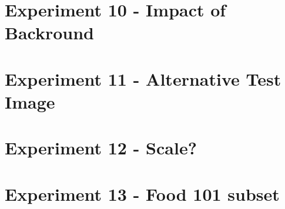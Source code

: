 \section{Experiment 10 - Impact of Backround}


\section{Experiment 11 - Alternative Test Image}


\section{Experiment 12 - Scale?}


\section{Experiment 13 - Food 101 subset}


